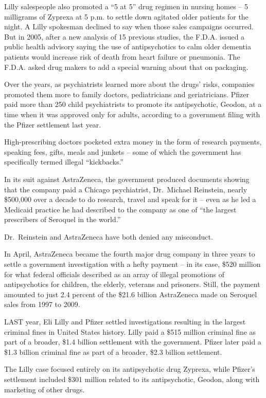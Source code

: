 ﻿\documentclass[12pt]{article}
\begin{document}
Lilly salespeople also promoted a ``5 at 5'' drug regimen in nursing homes -- 5 milligrams of
Zyprexa at 5 p.m. to settle down agitated older patients for the night. A Lilly spokesman declined
to say when those sales campaigns occurred. But in 2005, after a new analysis of 15 previous
studies, the F.D.A. issued a public health advisory saying the use of antipsychotics to calm older
dementia patients would increase risk of death from heart failure or pneumonia. The F.D.A. asked
drug makers to add a special warning about that on packaging.

Over the years, as psychiatrists learned more about the drugs' risks, companies promoted them more
to family doctors, pediatricians and geriatricians. Pfizer paid more than 250 child psychiatrists to
promote its antipsychotic, Geodon, at a time when it was approved only for adults, according to a
government filing with the Pfizer settlement last year.

High-prescribing doctors pocketed extra money in the form of research payments, speaking fees,
gifts, meals and junkets -- some of which the government has specifically termed illegal
``kickbacks.''

In its suit against AstraZeneca, the government produced documents showing that the company paid a
Chicago psychiatrist, Dr.~Michael Reinstein, nearly \$500,000 over a decade to do research, travel
and speak for it -- even as he led a Medicaid practice he had described to the company as one of
``the largest prescribers of Seroquel in the world.''

Dr.~Reinstein and AstraZeneca have both denied any misconduct.

In April, AstraZeneca became the fourth major drug company in three years to settle a government
investigation with a hefty payment -- in its case, \$520 million for what federal officials
described as an array of illegal promotions of antipsychotics for children, the elderly, veterans
and prisoners. Still, the payment amounted to just 2.4 percent of the \$21.6 billion AstraZeneca
made on Seroquel sales from 1997 to 2009.

LAST year, Eli Lilly and Pfizer settled investigations resulting in the largest criminal fines in
United States history. Lilly paid a \$515 million criminal fine as part of a broader, \$1.4 billion
settlement with the government. Pfizer later paid a \$1.3 billion criminal fine as part of a
broader, \$2.3 billion settlement.

The Lilly case focused entirely on its antipsychotic drug Zyprexa, while Pfizer's settlement
included \$301 million related to its antipsychotic, Geodon, along with marketing of other drugs.
\end{document}
